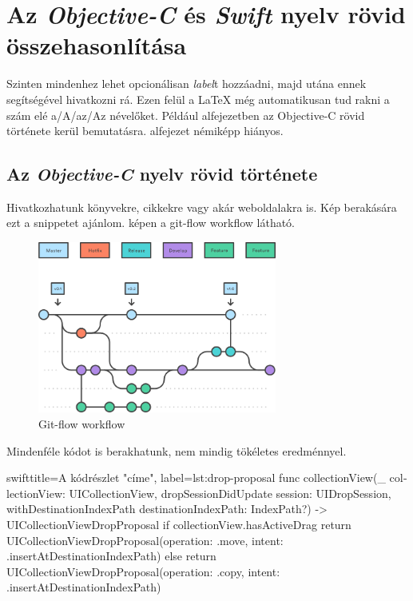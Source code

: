 \chapter{Az \textit{Objective-C} és \textit{Swift} nyelv rövid összehasonlítása}

Szinten mindenhez lehet opcionálisan \textit{label}t hozzáadni, majd utána ennek segítségével hivatkozni rá. Ezen felül a LaTeX még automatikusan tud rakni a szám elé a/A/az/Az névelőket. Például  alfejezetben az Objective-C rövid története kerül bemutatásra.  alfejezet némiképp hiányos.

\section{Az \textit{Objective-C} nyelv rövid története}
\label{sect:objc-c-short-history}
Hivatkozhatunk könyvekre, cikkekre vagy akár weboldalakra is.\cite{UncleBob} Kép berakására ezt a snippetet ajánlom.  képen a git-flow workflow látható.

\begin{figure}[H]
  \centering
  \includegraphics[width=0.7\textwidth, keepaspectratio]{figures/example_image.png}
  \caption{Git-flow workflow}
  \label{fig:git-flow}
\end{figure}

Mindenféle kódot is berakhatunk, nem mindig tökéletes eredménnyel.

\begin{otherlanguage}{english}
  \begin{code}{swift}{title={A kódrészlet "címe"}, label={lst:drop-proposal}}
func collectionView(_ collectionView: UICollectionView, dropSessionDidUpdate session: UIDropSession, withDestinationIndexPath destinationIndexPath: IndexPath?) -> UICollectionViewDropProposal {
  if collectionView.hasActiveDrag {
    return UICollectionViewDropProposal(operation: .move, intent: .insertAtDestinationIndexPath)
  } else {
    return UICollectionViewDropProposal(operation: .copy, intent: .insertAtDestinationIndexPath)
  }
}  
  \end{code}
\end{otherlanguage}


